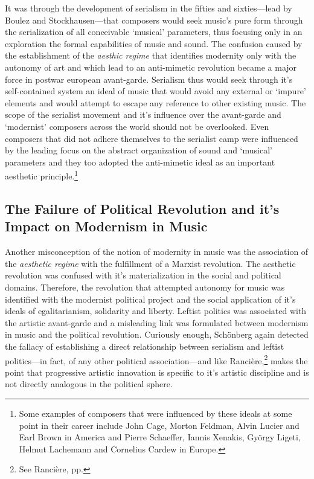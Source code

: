 It was through the development of serialism in the fifties and sixties---lead by Boulez and Stockhausen---that composers would seek music's pure form through the serialization of all conceivable `musical' parameters, thus focusing only in an exploration the formal capabilities of music and sound. The confusion caused by the establishment of the \emph{aesthic regime} that identifies modernity only with the autonomy of art and which lead to an anti-mimetic revolution became a major force in postwar european avant-garde. Serialism thus would seek through it's self-contained system an ideal of music that would avoid any external or `impure' elements and would attempt to escape any reference to other existing music. The scope of the serialist movement and it's influence over the avant-garde and `modernist' composers across the world should not be overlooked. Even composers that did not adhere themselves to the serialist camp were influenced by the leading focus on the abstract organization of sound and `musical' parameters and they too adopted the anti-mimetic ideal as an important aesthetic principle.\footnote{Some examples of composers that were influenced by these ideals at some point in their career include John Cage, Morton Feldman, Alvin Lucier and Earl Brown in America and Pierre Schaeffer, Iannis Xenakis, Gy\"{o}rgy Ligeti, Helmut Lachemann and Cornelius Cardew in Europe.}

\subsection{The Failure of Political Revolution and it's Impact on Modernism in Music}

Another misconception of the notion of modernity in music was the association of the \emph{aesthetic regime} with the fulfillment of a Marxist revolution. The aesthetic revolution was confused with it's materialization in the social and political domains. Therefore, the revolution that attempted autonomy for music was identified with the modernist political project and the social application of it's ideals of egalitarianism, solidarity and liberty.
Leftist politics was associated with the artistic avant-garde and a misleading link was formulated between modernism in music and the political revolution. Curiously enough, Sch\"{o}nberg again detected the fallacy of establishing a direct relationship between serialism and leftist politics---in fact, of any other political association---and like Ranci\`{e}re,\footnote{See Ranci\`{e}re, pp.} makes the point that progressive artistic innovation is specific to it's artistic discipline and is not directly analogous in the political sphere.


